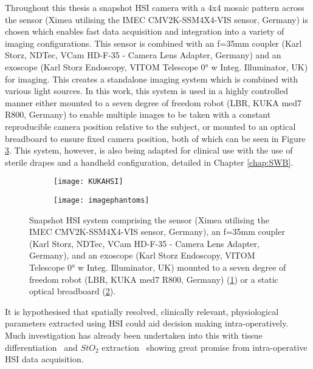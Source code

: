 Throughout this thesis a snapshot HSI camera with a 4x4 mosaic pattern across the sensor (Ximea utilising the IMEC CMV2K-SSM4X4-VIS sensor, Germany) is chosen which enables fast data acquisition and integration into a variety of imaging configurations. This sensor is combined with an f=35mm coupler (Karl Storz, NDTec, VCam HD-F-35 - Camera Lens Adapter, Germany) and an exoscope (Karl Storz Endoscopy, VITOM Telescope 0° w Integ. Illuminator, UK) for imaging. This creates a standalone imaging system which is combined with various light sources. In this work, this system is used in a highly controlled manner either mounted to a seven degree of freedom robot (LBR, KUKA med7 R800, Germany) to enable multiple images to be taken with a constant reproducible camera position relative to the subject, or mounted to an optical breadboard to ensure fixed camera position, both of which can be seen in Figure \ref{fig:HSIsetups}. This system, however, is also being adapted for clinical use with the use of sterile drapes and a handheld configuration, detailed in Chapter \ref{chap:SWB}. %
\begin{figure}[h]
    \centering 
    \begin{subfigure}[ht!]{0.27\textwidth}
	\texttt{[image: KUKAHSI]}
	\caption{}
	\label{fig:KUKAHSI}
    \end{subfigure}
    \begin{subfigure}[ht!]{0.16\textwidth}
        \texttt{[image: imagephantoms]}
        \caption{}
        \label{fig:ScopeHSI}
    \end{subfigure}
    \caption{Snapshot HSI system comprising the sensor (Ximea utilising the IMEC CMV2K-SSM4X4-VIS sensor, Germany), an f=35mm coupler (Karl Storz, NDTec, VCam HD-F-35 - Camera Lens Adapter, Germany), and an exoscope (Karl Storz Endoscopy, VITOM Telescope 0° w Integ. Illuminator, UK) mounted to a seven degree of freedom robot (LBR, KUKA med7 R800, Germany) (\ref{fig:KUKAHSI}) or a static optical breadboard (\ref{fig:ScopeHSI}).}
    \label{fig:HSIsetups}
\end{figure}
%
It is hypothesised that spatially resolved, clinically relevant, physiological parameters extracted using HSI could aid decision making intra-operatively. Much investigation has already been undertaken into this with tissue differentiation~\cite{Kabwama2016, Fabelo2019, Kho2019, Giannantonio2023} and $StO_2$ extraction~\cite{Yudovsky2015, Clancy2015, WOS:000360241100026, Wirkert2016, Clancy2020, Thoenissen2023} showing great promise from intra-operative HSI data acquisition. 

